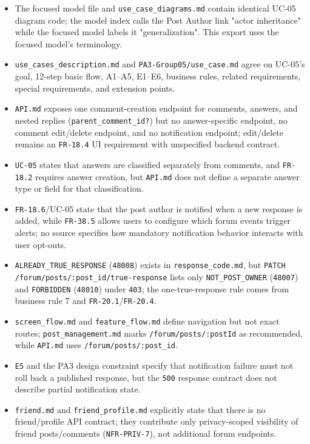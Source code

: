 \documentclass[12pt]{article}
\begin{document}
\begin{itemize}
\item The focused model file and \texttt{use\_case\_diagrams.md} contain identical UC-05 diagram code; the model index calls the Post Author link "actor inheritance" while the focused model labels it "generalization". This export uses the focused model's terminology.
\item \texttt{use\_cases\_description.md} and \texttt{PA3-Group05/use\_case.md} agree on UC-05's goal, 12-step basic flow, A1--A5, E1--E6, business rules, related requirements, special requirements, and extension points.
\item \texttt{API.md} exposes one comment-creation endpoint for comments, answers, and nested replies (\texttt{parent\_comment\_id?}) but no answer-specific endpoint, no comment edit/delete endpoint, and no notification endpoint; edit/delete remains an \texttt{FR-18.4} UI requirement with unspecified backend contract.
\item \texttt{UC-05} states that answers are classified separately from comments, and \texttt{FR-18.2} requires answer creation, but \texttt{API.md} does not define a separate answer type or field for that classification.
\item \texttt{FR-18.6}/UC-05 state that the post author is notified when a new response is added, while \texttt{FR-38.5} allows users to configure which forum events trigger alerts; no source specifies how mandatory notification behavior interacts with user opt-outs.
\item \texttt{ALREADY\_TRUE\_RESPONSE} (\texttt{48008}) exists in \texttt{response\_code.md}, but \texttt{PATCH /forum/posts/:post\_id/true-response} lists only \texttt{NOT\_POST\_OWNER} (\texttt{48007}) and \texttt{FORBIDDEN} (\texttt{48010}) under \texttt{403}; the one-true-response rule comes from business rule 7 and \texttt{FR-20.1}/\texttt{FR-20.4}.
\item \texttt{screen\_flow.md} and \texttt{feature\_flow.md} define navigation but not exact routes; \texttt{post\_management.md} marks \texttt{/forum/posts/:postId} as recommended, while \texttt{API.md} uses \texttt{/forum/posts/:post\_id}.
\item \texttt{E5} and the PA3 design constraint specify that notification failure must not roll back a published response, but the \texttt{500} response contract does not describe partial notification state.
\item \texttt{friend.md} and \texttt{friend\_profile.md} explicitly state that there is no friend/profile API contract; they contribute only privacy-scoped visibility of friend posts/comments (\texttt{NFR-PRIV-7}), not additional forum endpoints.
\end{itemize}
\par\medskip
\end{document}
